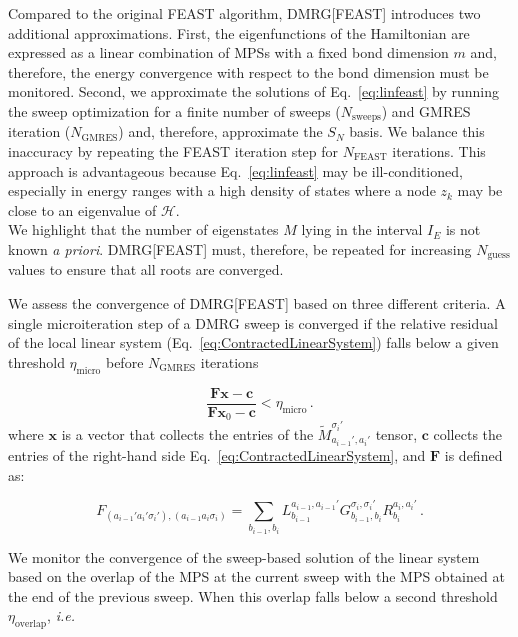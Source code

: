 \documentclass[journal=jctcce]{achemso}
\newcommand{\vct}[1]{\bm{#1}}
\begin{document}
\noindent Compared to the original FEAST algorithm, DMRG[FEAST] introduces two additional approximations.
First, the eigenfunctions of the Hamiltonian are expressed as a linear combination of MPSs with a fixed bond dimension $m$ and, therefore, the energy convergence with respect to the bond dimension must be monitored.
Second, we approximate the solutions of Eq.~\eqref{eq:linfeast} by running the sweep optimization for a finite number of sweeps ($N_\text{sweeps}$) and GMRES iteration ($N_\text{GMRES}$) and, therefore, approximate the $S_N$ basis.
We balance this inaccuracy by repeating the FEAST iteration step for $N_\text{FEAST}$ iterations.
This approach is advantageous because Eq.~\eqref{eq:linfeast} may be ill-conditioned, especially in energy ranges with a high density of states where a node $z_k$ may be close to an eigenvalue of $\mathcal{H}$. \\
We highlight that the number of eigenstates $M$ lying in the interval $I_E$ is not known \textit{a priori}.
DMRG[FEAST] must, therefore, be repeated for increasing $N_\text{guess}$ values to ensure that all roots are converged.

\noindent We assess the convergence of DMRG[FEAST] based on three different criteria.
A single microiteration step of a DMRG sweep is converged if the relative residual of the local linear system (Eq.~\eqref{eq:ContractedLinearSystem}) falls below a given threshold $\eta_\text{micro}$ before $N_\text{GMRES}$ iterations

\begin{equation}
  \frac{\textbf{F}\vct{x} - \vct{c}}{\textbf{F}\vct{x}_0 - \vct{c}} < \eta_\text{micro}\, .
  \label{eq:FirstConvergence}
\end{equation}
%
where $\vct{x}$ is a vector that collects the entries of the $\tilde{M}_{a_{i-1}',a_i'}^{\sigma_i'}$ tensor, $\vct{c}$ collects the entries of the right-hand side Eq.~\ref{eq:ContractedLinearSystem}, and $\textbf{F}$ is defined as:

\begin{equation}
  F_{(a_{i-1}'a_i'\sigma_i'),(a_{i-1}a_i\sigma_i)} = 
  \sum_{b_{i-1},b_i} 
    L^{a_{i-1},a_{i-1}'}_{b_{i-1}} G^{\sigma_i, \sigma_i'}_{b_{i-1}, b_i} R_{b_i}^{a_i, a_i'} \, .
  \label{eq:ContractedLinearSystemOperator}
\end{equation}

We monitor the convergence of the sweep-based solution of the linear system based on the overlap of the MPS at the current sweep with the MPS obtained at the end of the previous sweep.
When this overlap falls below a second threshold $\eta_\text{overlap}$, \textit{i.e.}
\end{document}
